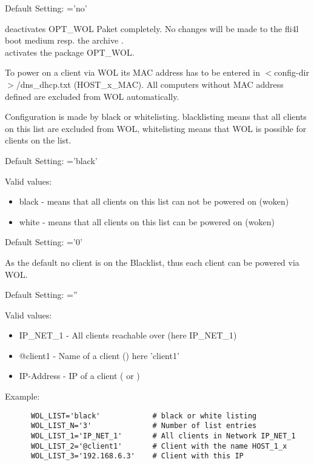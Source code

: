 \begin{description}


	Default Setting:  ='no'

	 deactivates OPT\_WOL Paket completely. No changes will
	be made to the fli4l boot medium resp. the archive .\\
	 activates the package OPT\_WOL.

	To power on a client via WOL its MAC address has to be entered in
	$<$config-dir$>$/dns\_dhcp.txt (HOST\_x\_MAC).
	All computers without MAC address defined are excluded from WOL automatically.


    Configuration is made by black or whitelisting.
    blacklisting means that all clients on this list are excluded from WOL, whitelisting
    means that WOL is possible for clients on the list.

	Default Setting:  ='black'

	Valid values:
	\begin{itemize}
		\item black - means that all clients on this list can not be powered on (woken)
		\item white - means that all clients on this list can be powered on (woken)
	\end{itemize}


	Default Setting:  ='0'

	As the default no client is on the Blacklist, thus each client can be powered via WOL.


	Default Setting:  =''

	Valid values:
	\begin{itemize}
		\item IP\_NET\_1	- All clients reachable over  (here IP\_NET\_1)
		\item @client1		- Name of a client () here 'client1'
		\item IP-Address	- IP of a client ( or )
	\end{itemize}

Example:
\begin{example}
\begin{verbatim}
      WOL_LIST='black'            # black or white listing
      WOL_LIST_N='3'              # Number of list entries
      WOL_LIST_1='IP_NET_1'       # All clients in Network IP_NET_1
      WOL_LIST_2='@client1'       # Client with the name HOST_1_x
      WOL_LIST_3='192.168.6.3'    # Client with this IP
\end{verbatim}
\end{example}

\end{description}

